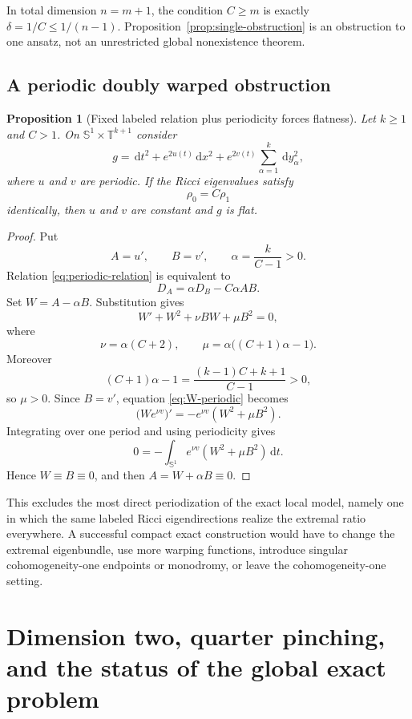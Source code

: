 \documentclass[11pt,reqno]{amsart}
\newtheorem{proposition}[theorem]{Proposition}
\theoremstyle{definition}
\theoremstyle{remark}
\newcommand{\dd}{\,\mathrm d}
\newcommand{\T}{\mathbb T}
\newcommand{\Sph}{\mathbb S}
\begin{document}
In total dimension $n=m+1$, the condition $C\ge m$ is exactly $\delta=1/C\le1/(n-1)$.  Proposition~\ref{prop:single-obstruction} is an obstruction to one ansatz, not an unrestricted global nonexistence theorem.

\subsection{A periodic doubly warped obstruction}

\begin{proposition}[Fixed labeled relation plus periodicity forces flatness]\label{prop:periodic-obstruction}
Let $k\ge1$ and $C>1$.  On $\Sph^1\times\T^{k+1}$ consider
\[
g=\dd t^2+e^{2u(t)}\dd x^2+e^{2v(t)}\sum_{\alpha=1}^k\dd y_\alpha^2,
\]
where $u$ and $v$ are periodic.  If the Ricci eigenvalues satisfy
\begin{equation}\label{eq:periodic-relation}
\rho_0=C\rho_1
\end{equation}
identically, then $u$ and $v$ are constant and $g$ is flat.
\end{proposition}

\begin{proof}
Put
\[
A=u',
\qquad B=v',
\qquad
\alpha=\frac{k}{C-1}>0.
\]
Relation \eqref{eq:periodic-relation} is equivalent to
\[
D_A=\alpha D_B-C\alpha AB.
\]
Set $W=A-\alpha B$.  Substitution gives
\begin{equation}\label{eq:W-periodic}
W'+W^2+\nu BW+\mu B^2=0,
\end{equation}
where
\[
\nu=\alpha(C+2),
\qquad
\mu=\alpha\bigl((C+1)\alpha-1\bigr).
\]
Moreover
\[
(C+1)\alpha-1
=\frac{(k-1)C+k+1}{C-1}>0,
\]
so $\mu>0$.  Since $B=v'$, equation \eqref{eq:W-periodic} becomes
\[
\bigl(We^{\nu v}\bigr)'
=-e^{\nu v}(W^2+\mu B^2).
\]
Integrating over one period and using periodicity gives
\[
0=-\int_{\Sph^1}e^{\nu v}(W^2+\mu B^2)\dd t.
\]
Hence $W\equiv B\equiv0$, and then $A=W+\alpha B\equiv0$.
\end{proof}

This excludes the most direct periodization of the exact local model, namely one in which the same labeled Ricci eigendirections realize the extremal ratio everywhere.  A successful compact exact construction would have to change the extremal eigenbundle, use more warping functions, introduce singular cohomogeneity-one endpoints or monodromy, or leave the cohomogeneity-one setting.

\section{Dimension two, quarter pinching, and the status of the global exact problem}\label{sec:summary}
\end{document}
